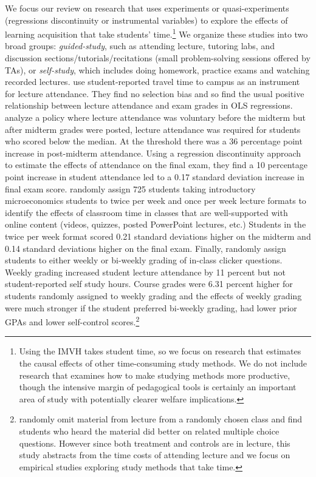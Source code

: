 \documentclass[12pt]{article}
\begin{document}
We focus our review on research that uses experiments or quasi-experiments (regressions discontinuity or instrumental variables) to explore the effects of learning acquisition that take students' time.\footnote{Using the IMVH takes student time, so we focus on research that estimates the causal effects of other time-consuming study methods. We do not include research that examines how to make studying methods more productive, though the intensive margin of pedagogical tools is certainly an important area of study with potentially clearer welfare implications.} We organize these studies into two broad groups: \textit{guided-study}, such as attending lecture, tutoring labs, and discussion sections/tutorials/recitations (small problem-solving sessions offered by TAs), or \textit{self-study}, which includes doing homework, practice exams and watching recorded lectures. \textcite{km2003} use student-reported travel time to campus as an instrument for lecture attendance. They find no selection bias and so find the usual positive relationship between lecture attendance and exam grades in OLS regressions. \textcite{dgm2010} analyze a policy where lecture attendance was voluntary before the midterm but after midterm grades were posted, lecture attendance was required for students who scored below the median. At the threshold there was a 36 percentage point increase in post-midterm attendance. Using a regression discontinuity approach to estimate the effects of attendance on the final exam, they find a 10 percentage point increase in student attendance led to a 0.17 standard deviation increase in final exam score. \textcite{jcjao2015} randomly assign 725 students taking introductory microeconomics students to twice per week and once per week lecture formats to identify the effects of classroom time in classes that are well-supported with online content (videos, quizzes, posted PowerPoint lectures, etc.) Students in the twice per week format scored 0.21 standard deviations higher on the midterm and 0.14 standard deviations higher on the final exam. Finally, \textcite{tlad2020} randomly assign students to either weekly or bi-weekly grading of in-class clicker questions. Weekly grading increased student lecture attendance by 11 percent but not student-reported self study hours. Course grades were 6.31 percent higher for students randomly assigned to weekly grading and the effects of weekly grading were much stronger if the student preferred bi-weekly grading, had lower prior GPAs and lower self-control scores.\footnote{\textcite{cl2008} randomly omit material from lecture from a randomly chosen class and find students who heard the material did better on related multiple choice questions. However since both treatment and controls are in lecture, this study abstracts from the time costs of attending lecture and we focus on empirical studies exploring study methods that take time.}
\end{document}
